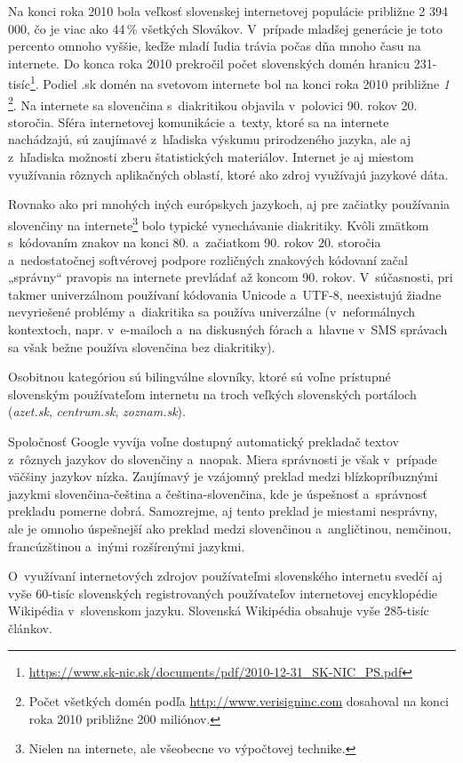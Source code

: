 \noindent Na konci roka 2010 bola veľkosť slovenskej internetovej
populácie približne 2 394 000, čo je viac ako 44\,\% všetkých
Slovákov. V~prípade mladšej generácie je toto percento omnoho
vyššie, keďže mladí ľudia trávia počas dňa mnoho času na
internete. Do konca roka 2010 prekročil počet slovenských domén
hranicu
231-tisíc\footnote{\url{https://www.sk-nic.sk/documents/pdf/2010-12-31_SK-NIC_PS.pdf}}.
Podiel .sk domén na svetovom internete bol na konci roka 2010
približne \emph{1\,\textperthousand}\footnote{Počet všetkých domén
podľa \url{http://www.verisigninc.com} dosahoval na konci roka 2010
približne 200 miliónov.}. Na internete sa slovenčina s~diakritikou
objavila v~polovici 90. rokov 20. storočia. Sféra internetovej
komunikácie a~texty, ktoré sa na internete nachádzajú, sú
zaujímavé z~hľadiska výskumu prirodzeného jazyka, ale aj
z~hľadiska možnosti zberu štatistických materiálov. Internet je aj
miestom využívania rôznych aplikačných oblastí, ktoré ako zdroj
využívajú jazykové dáta. 

Rovnako ako pri mnohých iných európskych jazykoch, aj pre začiatky
používania slovenčiny na internete\footnote{Nielen na internete, ale všeobecne vo výpočtovej technike.} bolo typické vynechávanie diakritiky. Kvôli
zmätkom s~kódovaním znakov na konci 80. a~začiatkom 90. rokov 20.
storočia a~nedostatočnej softvérovej podpore rozličných znakových
kódovaní začal „správny“ pravopis na internete prevládať až
koncom 90. rokov. V~súčasnosti, pri takmer univerzálnom používaní
kódovania Unicode a~UTF-8, neexistujú žiadne nevyriešené problémy
a~diakritika sa používa univerzálne (v~neformálnych kontextoch,
napr. v~e-mailoch a~na diskusných fórach a~hlavne v~SMS správach
sa však bežne používa slovenčina bez diakritiky).

Osobitnou kategóriou sú bilingválne slovníky, ktoré sú voľne
prístupné slovenským používateľom internetu na troch veľkých
slovenských portáloch (\emph{azet.sk}, \emph{centrum.sk},
\emph{zoznam.sk}).

Spoločnosť Google vyvíja voľne dostupný automatický prekladač
textov z~rôznych jazykov do slovenčiny a~naopak. Miera správnosti je
však v~prípade väčšiny jazykov nízka. Zaujímavý je vzájomný
preklad medzi blízkopríbuznými jazykmi slovenčina-čeština a
čeština-slovenčina, kde je úspešnosť a~správnosť prekladu
pomerne dobrá. Samozrejme, aj tento preklad je miestami nesprávny, ale je
omnoho úspešnejší ako preklad medzi slovenčinou a~angličtinou,
nemčinou, francúzštinou a~inými rozšírenými jazykmi.

O~využívaní internetových zdrojov používateľmi slovenského
internetu svedčí aj vyše 60-tisíc slovenských registrovaných
používateľov internetovej encyklopédie Wikipédia v~slovenskom
jazyku. Slovenská Wikipédia obsahuje vyše 285-tisíc
článkov.
